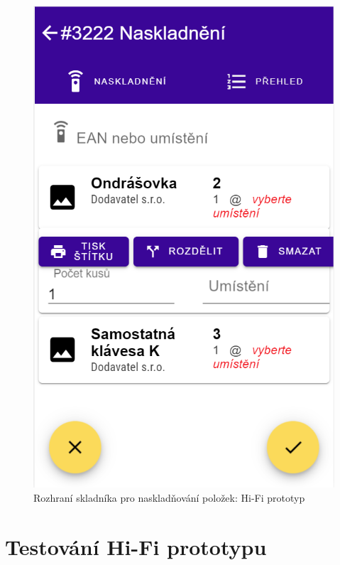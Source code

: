 \begin{figure}[]
\includegraphics[height=0.6\textheight]{../png/hifi/naskladneni.png}
\caption{Rozhraní skladníka pro naskladňování položek: Hi-Fi prototyp} \label{picture:hifi}
\end{figure}


\section{Testování Hi-Fi prototypu}

